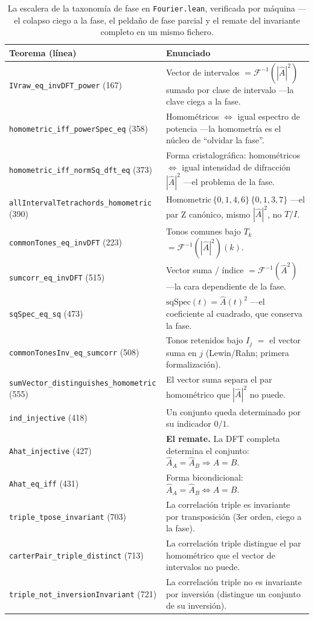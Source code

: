 \documentclass[11pt]{article}
\newcommand{\lean}[1]{\texttt{#1}}
\newcommand{\Ahat}{\hat{A}}
\newcommand{\Fi}{\mathcal{F}^{-1}}
\begin{document}
\begin{table}[ht]
\centering\small
{}
\begin{tabular}{@{}l p{}@{}}
\toprule
\rowcolor{ctA!22}
\textbf{Teorema (línea)} & \textbf{Enunciado}\\
\midrule
\lean{IVraw\_eq\_invDFT\_power} (167)         & Vector de intervalos $=\Fi(|\Ahat|^2)$ sumado por clase de intervalo ---la clave ciega a la fase.\\
\lean{homometric\_iff\_powerSpec\_eq} (358)   & Homométricos $\iff$ igual espectro de potencia ---la homometría es el núcleo de ``olvidar la fase''.\\
\lean{homometric\_iff\_normSq\_dft\_eq} (373) & Forma cristalográfica: homométricos $\iff$ igual intensidad de difracción $|\Ahat|^2$ ---el problema de la fase.\\
\lean{allIntervalTetrachords\_homometric} (390) & $\mathrm{Homometric}\,\{0,1,4,6\}\,\{0,1,3,7\}$ ---el par Z canónico, mismo $|\Ahat|^2$, no $T/I$.\\
\lean{commonTones\_eq\_invDFT} (223)          & Tonos comunes bajo $T_k$ $=\Fi(|\Ahat|^2)(k)$.\\
\lean{sumcorr\_eq\_invDFT} (515)              & Vector suma / índice $=\Fi(\Ahat^2)$ ---la cara dependiente de la fase.\\
\lean{sqSpec\_eq\_sq} (473)                   & $\mathrm{sqSpec}(t)=\Ahat(t)^2$ ---el coeficiente al cuadrado, que conserva la fase.\\
\lean{commonTonesInv\_eq\_sumcorr} (508)      & Tonos retenidos bajo $I_j$ $=$ el vector suma en $j$ (Lewin/Rahn; primera formalización).\\
\lean{sumVector\_distinguishes\_homometric} (555) & El vector suma separa el par homométrico que $|\Ahat|^2$ no puede.\\
\lean{ind\_injective} (418)                   & Un conjunto queda determinado por su indicador $0/1$.\\
\lean{Ahat\_injective} (427)                  & \textbf{El remate.} La DFT completa determina el conjunto: $\Ahat_A=\Ahat_B\Rightarrow A=B$.\\
\lean{Ahat\_eq\_iff} (431)                    & Forma bicondicional: $\Ahat_A=\Ahat_B\iff A=B$.\\
\lean{triple\_tpose\_invariant} (703)         & La correlación triple es invariante por transposición (3er orden, ciego a la fase).\\
\lean{carterPair\_triple\_distinct} (713)     & La correlación triple distingue el par homométrico que el vector de intervalos no puede.\\
\lean{triple\_not\_inversionInvariant} (721)  & La correlación triple no es invariante por inversión (distingue un conjunto de su inversión).\\
\bottomrule
\end{tabular}
\caption{La escalera de la taxonomía de fase en \lean{Fourier.lean}, verificada por máquina ---el colapso
ciego a la fase, el peldaño de fase parcial y el remate del invariante completo en un mismo fichero.}
\label{tab:lean}
\end{table}
\end{document}
